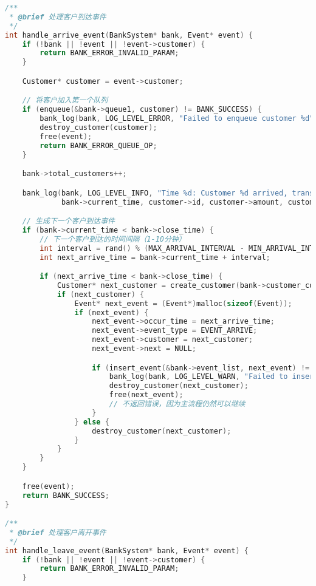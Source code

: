 \documentclass[12pt,a4paper]{article}
\begin{document}
\begin{lstlisting}[language=C,caption=bank\_simulation.c]
/**
 * @brief 处理客户到达事件
 */
int handle_arrive_event(BankSystem* bank, Event* event) {
    if (!bank || !event || !event->customer) {
        return BANK_ERROR_INVALID_PARAM;
    }

    Customer* customer = event->customer;

    // 将客户加入第一个队列
    if (enqueue(&bank->queue1, customer) != BANK_SUCCESS) {
        bank_log(bank, LOG_LEVEL_ERROR, "Failed to enqueue customer %d", customer->id);
        destroy_customer(customer);
        free(event);
        return BANK_ERROR_QUEUE_OP;
    }

    bank->total_customers++;

    bank_log(bank, LOG_LEVEL_INFO, "Time %d: Customer %d arrived, transaction amount %d, service time %d", 
             bank->current_time, customer->id, customer->amount, customer->duration);

    // 生成下一个客户到达事件
    if (bank->current_time < bank->close_time) {
        // 下一个客户到达的时间间隔（1-10分钟）
        int interval = rand() % (MAX_ARRIVAL_INTERVAL - MIN_ARRIVAL_INTERVAL + 1) + MIN_ARRIVAL_INTERVAL;
        int next_arrive_time = bank->current_time + interval;

        if (next_arrive_time < bank->close_time) {
            Customer* next_customer = create_customer(bank->customer_count++, next_arrive_time);
            if (next_customer) {
                Event* next_event = (Event*)malloc(sizeof(Event));
                if (next_event) {
                    next_event->occur_time = next_arrive_time;
                    next_event->event_type = EVENT_ARRIVE;
                    next_event->customer = next_customer;
                    next_event->next = NULL;

                    if (insert_event(&bank->event_list, next_event) != BANK_SUCCESS) {
                        bank_log(bank, LOG_LEVEL_WARN, "Failed to insert next arrival event");
                        destroy_customer(next_customer);
                        free(next_event);
                        // 不返回错误，因为主流程仍然可以继续
                    }
                } else {
                    destroy_customer(next_customer);
                }
            }
        }
    }

    free(event);
    return BANK_SUCCESS;
}

/**
 * @brief 处理客户离开事件
 */
int handle_leave_event(BankSystem* bank, Event* event) {
    if (!bank || !event || !event->customer) {
        return BANK_ERROR_INVALID_PARAM;
    }


\end{lstlisting}
\end{document}
